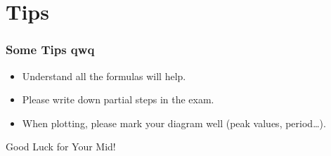\documentclass{beamer}
\begin{document}
\begin{frame}
\frametitle{}
\end{frame}



\section{Tips}
\begin{frame}
    \frametitle{Some Tips qwq}
    \begin{itemize}
        \item Understand all the formulas will help.
        \item Please write down partial steps in the exam.
        \item When plotting, please mark your diagram well (peak values, period\dots).
    \end{itemize}
    

\end{frame}

\begin{frame}
\Huge{\centerline{Good Luck for Your Mid!}}

\end{frame}

\end{document}
